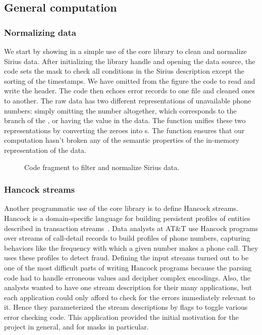 \documentclass{sig-alternate}
\newcommand{\dibbler}{Sirius}
\begin{document}
\subsection{General computation}
\subsubsection{Normalizing data}
\label{subsec:general}
We start by showing in  a simple use of 
the core library to clean and normalize \dibbler{} data. After initializing
the \pads{} library handle and opening the data source, the code sets
the mask to check all conditions in the \dibbler{} description except the
sorting of the timestamps.  We have omitted from the figure the code to read and write the header. 
The code then echoes error records to one file and cleaned ones to another.
The raw data has two different representations of unavailable phone numbers:
simply omitting the number altogether, which corresponds to the 
branch of the , or having the value  in the data.  
The function  unifies these two representations 
by converting the zeroes into s.  The function 
ensures that our computation hasn't broken any of the semantic properties
of the in-memory representation of the data.
\begin{figure}[t]
\begin{small}
\begin{center}

\caption{Code fragment to filter and normalize \dibbler{} data.}
\label{figure:dibbler-filter}
\end{center}
\end{small}
\end{figure}

\subsubsection{Hancock streams}
Another programmatic use of the core library is to define  
Hancock streams.  Hancock is a domain-specific language for
building persistent profiles of entities described in transaction 
streams~\cite{hancock-toplas}.  Data analysts at AT\&T use Hancock 
programs over streams of call-detail records to build 
profiles of phone numbers, capturing behaviors like the frequency with which a given number makes a phone call.  They uses these profiles
to detect fraud. 
Defining the input streams turned out to be one of the most
difficult parts of writing Hancock programs because the parsing
code had to handle erroneous values and decipher complex encodings.  
Also, the analysts wanted to have one stream description for their
many applications, but each application could only afford to check for the errors immediately relevant to it.  Hence they parameterized the 
stream descriptions by flags to toggle various error checking code.
This application provided the initial motivation for the \pads{} project
in general, and for masks in particular.
\end{document}
